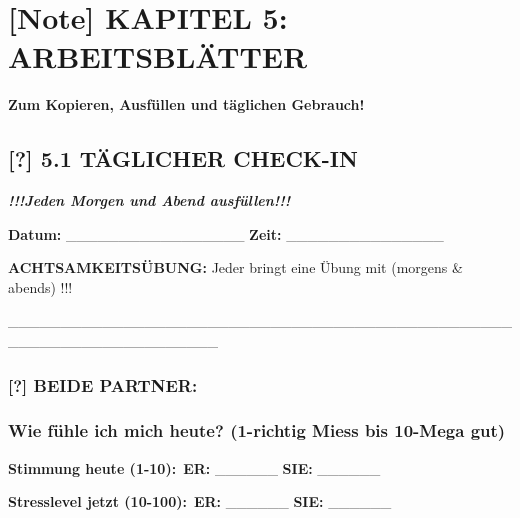 \hypertarget{kapitel-5-arbeitsbluxe4tter}{%
\section{[Note] KAPITEL 5: ARBEITSBLÄTTER}\label{kapitel-5-arbeitsbluxe4tter}}

\textbf{Zum Kopieren, Ausfüllen und täglichen Gebrauch!}

\hypertarget{tuxe4glicher-check-in}{%
\subsection{\texorpdfstring{[?] \textbf{5.1 TÄGLICHER CHECK-IN}}{[?] 5.1 TÄGLICHER CHECK-IN}}\label{tuxe4glicher-check-in}}

\emph{\textbf{!!!Jeden Morgen und Abend ausfüllen!!!}}

\textbf{Datum:} \_\_\_\_\_\_\_\_\_\_\_\_\_\_\_\_\_ \textbf{Zeit:} \_\_\_\_\_\_\_\_\_\_\_\_\_\_\_

\textbf{ACHTSAMKEITSÜBUNG:} Jeder bringt eine Übung mit (morgens \& abends) !!!

\_\_\_\_\_\_\_\_\_\_\_\_\_\_\_\_\_\_\_\_\_\_\_\_\_\_\_\_\_\_\_\_\_\_\_\_\_\_\_\_\_\_\_\_\_\_\_\_\_\_\_\_\_\_\_\_\_\_\_\_\_\_\_\_\_\_\_\_

\hypertarget{section}{%
\subsubsection{}\label{section}}

\hypertarget{beide-partner}{%
\subsubsection{\texorpdfstring{\textbf{[?] BEIDE PARTNER:} }{[?] BEIDE PARTNER: }}\label{beide-partner}}

\hypertarget{wie-fuxfchle-ich-mich-heute-1-richtig-miess-bis-10-mega-gut}{%
\subsubsection{\texorpdfstring{\textbf{Wie fühle ich mich heute? (1-richtig Miess bis 10-Mega gut)}}{Wie fühle ich mich heute? (1-richtig Miess bis 10-Mega gut)}}\label{wie-fuxfchle-ich-mich-heute-1-richtig-miess-bis-10-mega-gut}}

\textbf{Stimmung heute (1-10):}\
\textbf{ER:} \_\_\_\_\_\_ \textbf{SIE:} \_\_\_\_\_\_

\textbf{Stresslevel jetzt (10-100):}\
\textbf{ER:} \_\_\_\_\_\_ \textbf{SIE:} \_\_\_\_\_\_

